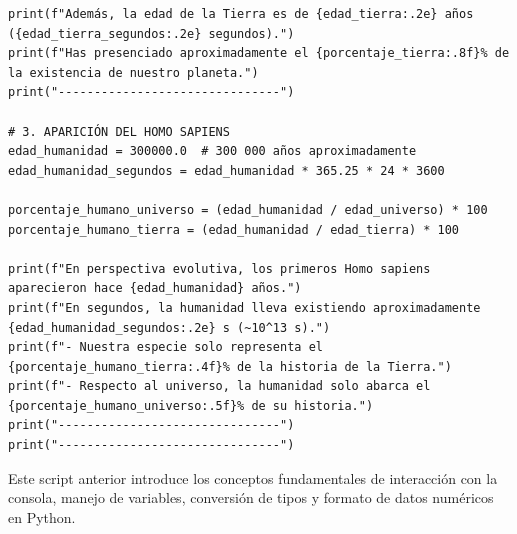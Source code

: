 \documentclass[12pt]{article}
\begin{document}
\begin{lstlisting}[captionpos=t, title=\texttt{primer\_programa.py}]
print(f"Además, la edad de la Tierra es de {edad_tierra:.2e} años ({edad_tierra_segundos:.2e} segundos).")
print(f"Has presenciado aproximadamente el {porcentaje_tierra:.8f}% de la existencia de nuestro planeta.")
print("-------------------------------")

# 3. APARICIÓN DEL HOMO SAPIENS
edad_humanidad = 300000.0  # 300 000 años aproximadamente
edad_humanidad_segundos = edad_humanidad * 365.25 * 24 * 3600

porcentaje_humano_universo = (edad_humanidad / edad_universo) * 100
porcentaje_humano_tierra = (edad_humanidad / edad_tierra) * 100

print(f"En perspectiva evolutiva, los primeros Homo sapiens aparecieron hace {edad_humanidad} años.")
print(f"En segundos, la humanidad lleva existiendo aproximadamente {edad_humanidad_segundos:.2e} s (~10^13 s).")
print(f"- Nuestra especie solo representa el {porcentaje_humano_tierra:.4f}% de la historia de la Tierra.")
print(f"- Respecto al universo, la humanidad solo abarca el {porcentaje_humano_universo:.5f}% de su historia.")
print("-------------------------------")
print("-------------------------------")
\end{lstlisting}
%  

Este script anterior introduce los conceptos fundamentales de interacción 
con la consola, manejo de variables, conversión de tipos y formato de datos numéricos en Python.
\end{document}
